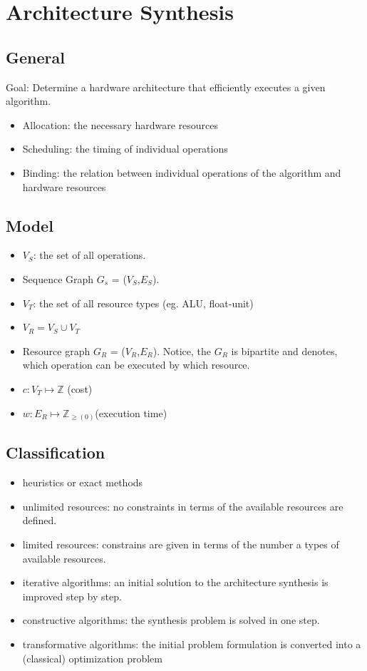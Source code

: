 \section{Architecture Synthesis}

\subsection{General}

Goal: Determine a hardware architecture that efficiently executes a given algorithm.

\begin{itemize}[noitemsep]
\item Allocation: the necessary hardware resources
\item Scheduling: the timing of individual operations
\item Binding: the relation between individual operations of the algorithm and hardware resources
\end{itemize}

\subsection{Model}

\begin{itemize}[noitemsep]
\item $V_S$: the set of all operations.
\item Sequence Graph $G_s$ = ($V_S$,$E_S$).
\item $V_T$: the set of all resource types (eg. ALU, float-unit)
\item $V_R = V_S \cup V_T$
\item Resource graph $G_R$ = ($V_R$,$E_R$). Notice, the $G_R$ is bipartite and denotes, which operation can be executed by which resource.
\item $c: V_T \mapsto \mathbb{Z}$ (cost)
\item $w: E_R \mapsto \mathbb{Z}_{\geq(0)}$(execution time)
\end{itemize}

\subsection{Classification}

\begin{itemize}[noitemsep]
\item heuristics or exact methods
\item unlimited resources: no constraints in terms of the available resources are defined.
\item limited resources: constrains are given in terms of the number a types of available resources.
\item iterative algorithms: an initial solution to the architecture synthesis is improved step by step.
\item constructive algorithms: the synthesis problem is solved in one step.
\item transformative algorithms: the initial problem formulation is converted into a (classical) optimization problem
\end{itemize}

